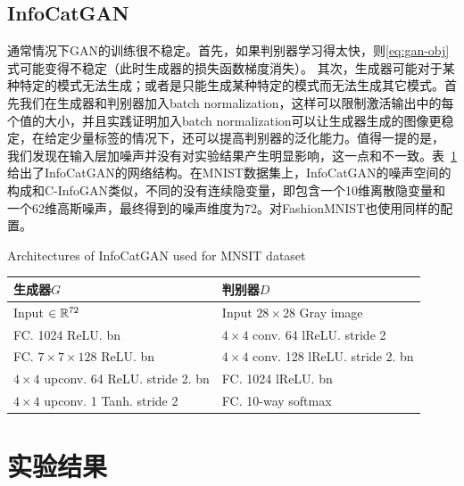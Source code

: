 \subsection{InfoCatGAN}
通常情况下GAN的训练很不稳定。首先，如果判别器学习得太快，则\eqref{eq:gan-obj}式可能变得不稳定（此时生成器的损失函数梯度消失）。
其次，生成器可能对于某种特定的模式无法生成；或者是只能生成某种特定的模式而无法生成其它模式。首先我们在生成器和判别器加入batch normalization，这样可以限制激活输出中的每个值的大小，并且实践证明加入batch normalization可以让生成器生成的图像更稳定，在给定少量标签的情况下，还可以提高判别器的泛化能力。值得一提的是，
我们发现在输入层加噪声并没有对实验结果产生明显影响，这一点和\citet{springenberg2015unsupervised}不一致。表~\ref{tab:m-icg-netarch}给出了InfoCatGAN的网络结构。在MNIST数据集上，InfoCatGAN的噪声空间的构成和C-InfoGAN类似，不同的没有连续隐变量，即包含一个10维离散隐变量和一个62维高斯噪声，最终得到的噪声维度为72。对FashionMNIST也使用同样的配置。
\begin{table}[h]
  \centering
  {Architectures of InfoCatGAN used for MNSIT dataset}
  \begin{tabular}{l|l}
    \toprule
    \textbf{生成器$G$}                        & \textbf{判别器$D$} \\
    \midrule
    Input $\in \mathbb{R}^{72}$                   & Input $28\times 28$ Gray image \\ \hline
    FC. 1024 ReLU. bn                         & $4\times 4$ conv. 64 lReLU. stride 2  \\ \hline
    FC. $7\times7\times128$ ReLU. bn          & $4\times 4$ conv. 128 lReLU. stride 2. bn \\ \hline
    $4\times 4$ upconv. 64 ReLU. stride 2. bn & FC. 1024 lReLU. bn \\ \hline
    $4\times 4$ upconv. 1 Tanh. stride 2     & FC. 10-way softmax \\
    \bottomrule
  \end{tabular}
  \label{tab:m-icg-netarch}
\end{table}

\section{实验结果}\label{sec:results}

